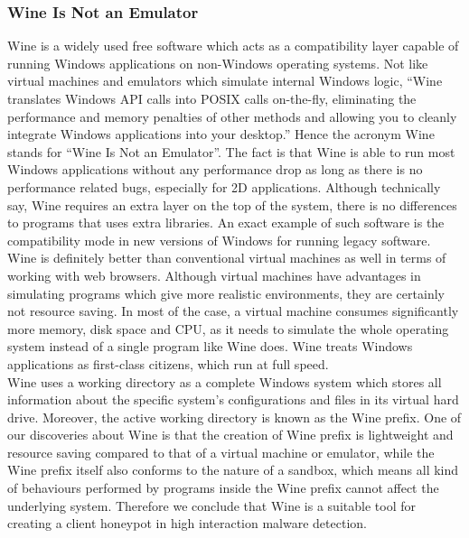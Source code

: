 \subsubsection{Wine Is Not an Emulator}
Wine is a widely used free software which acts as a compatibility layer 
capable of running Windows applications on non-Windows operating 
systems.\cite{wikiwine} Not like virtual machines and emulators which simulate 
internal Windows logic, ``Wine translates Windows API calls into POSIX calls 
on-the-fly, eliminating the performance and memory penalties of other methods 
and allowing you to cleanly integrate Windows applications into your 
desktop.''\cite{aboutwine} Hence the acronym Wine stands for ``Wine Is Not an 
Emulator''. The fact is that Wine is able to run most Windows applications 
without any performance drop as long as there is no performance related bugs, 
especially for 2D applications. Although technically say, Wine requires an 
extra layer on the top of the system, there is no differences to programs that 
uses extra libraries. An exact example of such software is the compatibility 
mode in new versions of Windows for running legacy 
software.\cite{wineperformance} \\
Wine is definitely better than conventional virtual machines as well in terms 
of working with web browsers. Although 
virtual machines have advantages in simulating programs which give more 
realistic environments, they are certainly not resource saving. In most of the 
case, a virtual machine consumes significantly more memory, disk space and 
CPU, as it needs to simulate the whole operating system instead of a single 
program like Wine does. Wine treats Windows applications as first-class 
citizens, which run at full speed.\cite{wineperformance} \\
Wine uses a working directory as a complete Windows system which stores all 
information about the specific system's configurations and files in its virtual 
hard drive. Moreover, the active working directory is known as the Wine prefix. 
One of our discoveries about Wine is that the creation of Wine prefix is 
lightweight and resource saving compared to that of a virtual machine or
emulator, while the Wine prefix itself also conforms to the nature of a 
sandbox, which means all kind of behaviours performed by programs inside the 
Wine prefix cannot affect the underlying system. Therefore we conclude that 
Wine is a suitable tool for creating a client honeypot in high interaction 
malware detection. \\

